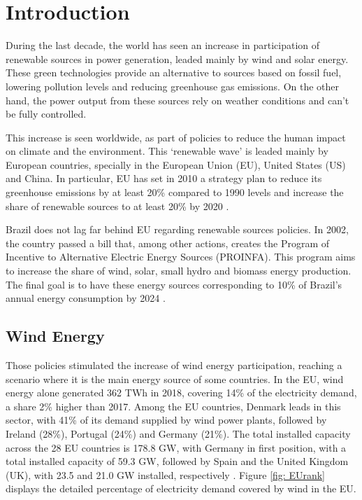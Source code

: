 
\chapter[Introduction]{Introduction}
\label{ch: Intro}

During the last decade, the world has seen an increase in participation of renewable sources in power generation, leaded mainly by wind and solar energy. These green technologies provide an alternative to sources based on fossil fuel, lowering pollution levels and reducing greenhouse gas emissions. On the other hand, the power output from these sources rely on weather conditions and can't be fully controlled.

This increase is seen worldwide, as part of policies to reduce the human impact on climate and the environment. This `renewable wave' is leaded mainly by European countries, specially in the European Union (EU), United States (US) and China. In particular, EU has set in 2010 a strategy plan to reduce its greenhouse emissions by at least 20\% compared to 1990 levels and increase the share of renewable sources to at least 20\% by 2020 \cite{Europe2020}.

Brazil does not lag far behind EU regarding renewable sources policies. In 2002, the country passed a bill that, among other actions, creates the Program of Incentive to Alternative Electric Energy Sources (PROINFA). This program aims to increase the share of wind, solar, small hydro and biomass energy production. The final goal is to have these energy sources corresponding to 10\% of Brazil's annual energy consumption by 2024 \cite{Brazil2002}.

\section{Wind Energy}

Those policies stimulated the increase of wind energy participation, reaching a scenario where it is the main energy source of some countries. In the EU, wind energy alone generated 362 TWh in 2018, covering 14\% of the electricity demand, a share 2\% higher than 2017. Among the EU countries, Denmark leads in this sector, with 41\% of its demand supplied by wind power plants, followed by Ireland (28\%), Portugal (24\%) and Germany (21\%). The total installed capacity across the 28 EU countries is 178.8 GW, with Germany in first position, with a total installed capacity of 59.3 GW, followed by Spain and the United Kingdom (UK), with 23.5 and 21.0 GW installed, respectively \cite{WindEurope2019}. Figure \ref{fig: EUrank} displays the detailed percentage of electricity demand covered by wind in the EU.


